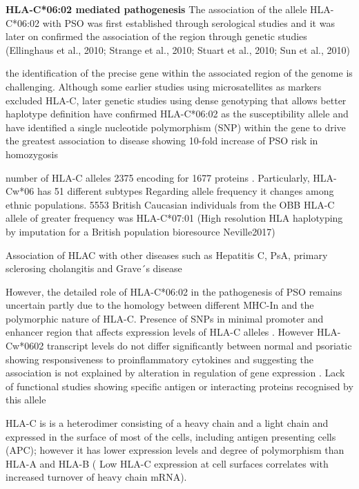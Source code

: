 \textbf{HLA-C*06:02 mediated pathogenesis}
The association of the allele HLA-C*06:02 with PSO was first established through serological studies \parencite{Rusell1972, Tiilikainen1980} and it was later on confirmed the association of the region through genetic studies (Ellinghaus et al., 2010; Strange et al., 2010; Stuart et al., 2010; Sun et al., 2010)

the  identification of the precise gene within the associated region of the genome is challenging. Although some earlier studies using microsatellites as markers excluded HLA-C, later genetic studies using dense genotyping that allows better haplotype definition have confirmed HLA-C*06:02 as the susceptibility allele and have identified a single nucleotide polymorphism (SNP) within the gene to drive the greatest association  to disease \parencite{Nair2006, Nair2009} showing 10-fold increase of PSO risk in homozygosis \parencite{Perera2012}


number of HLA-C alleles 2375 encoding for 1677 proteins \parencite{Robinson2013}. Particularly, HLA-Cw*06 has 51 different subtypes 
Regarding allele frequency it changes among ethnic populations. 5553 British Caucasian individuals from the OBB HLA-C allele of greater frequency was HLA-C*07:01 (High resolution HLA haplotyping by imputation for a British population bioresource Neville2017)



Association of HLAC with other diseases such as Hepatitis C, PsA, primary sclerosing cholangitis and Grave´s disease \parencite{Blais2011}

However, the detailed role of HLA-C*06:02 in the pathogenesis of PSO remains uncertain partly due to the homology between different MHC-In and the polymorphic nature of HLA-C. 
	Presence of SNPs in minimal promoter and enhancer region that affects expression levels of HLA-C alleles \parencite{Clop2013, Hundhausen2012}. However HLA-Cw*0602 transcript levels do not differ significantly between normal and psoriatic showing responsiveness to proinflammatory cytokines and suggesting the association is not explained by alteration in regulation of gene expression \parencite{Hundhausen2012}. 
	Lack of functional studies showing specific antigen or interacting proteins recognised by this allele
	
HLA-C is  is a heterodimer consisting of a heavy chain and a light chain and expressed in the surface of most of the cells, including antigen presenting cells (APC); however it has lower expression levels and degree of polymorphism than HLA-A and HLA-B ( Low HLA-C expression at cell surfaces correlates with increased turnover of heavy chain mRNA).

